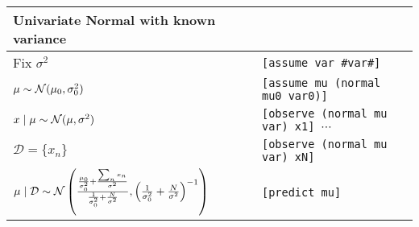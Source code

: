 \begin{table}[ht!]
\begin{tabular}{ll}
\toprule
Univariate Normal with known variance & \\
\midrule
Fix $\sigma^2$																		& \texttt{[assume var \#var\#]} \\
$\mu \sim \operatorname{\mathcal N}(\mu_0, \sigma_0^2)$												& \texttt{[assume mu (normal mu0 var0)]} \\
$x \mid \mu \sim \operatorname{\mathcal N}(\mu, \sigma^2)$										& \texttt{[observe (normal mu var) x1] $\cdots$} \\
$\mathcal D = \{x_n\}$																& \texttt{[observe (normal mu var) xN]} \\
$\mu \mid \mathcal D \sim \operatorname{\mathcal N}\left(\frac{\frac{\mu_0}{\sigma_0^2} + \frac{\sum_n x_n}{\sigma^2}}{\frac{1}{\sigma_0^2} + \frac{N}{\sigma^2}}, \left(\frac{1}{\sigma_0^2} + \frac{N}{\sigma^2}\right)^{-1}\right)$		& \texttt{[predict mu]} \\
\bottomrule
\end{tabular}
\end{table}

